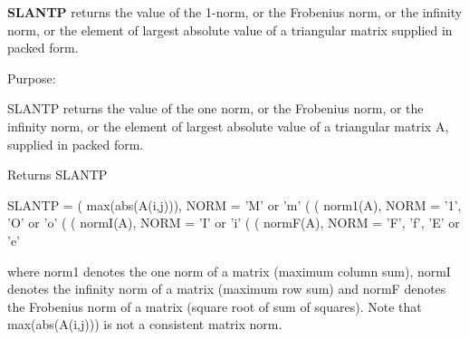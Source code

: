 {\bfseries S\+L\+A\+N\+T\+P} returns the value of the 1-\/norm, or the Frobenius norm, or the infinity norm, or the element of largest absolute value of a triangular matrix supplied in packed form. 

 \begin{DoxyParagraph}{Purpose\+: }
\begin{DoxyVerb} SLANTP  returns the value of the one norm,  or the Frobenius norm, or
 the  infinity norm,  or the  element of  largest absolute value  of a
 triangular matrix A, supplied in packed form.\end{DoxyVerb}

\end{DoxyParagraph}
\begin{DoxyReturn}{Returns}
S\+L\+A\+N\+T\+P \begin{DoxyVerb}    SLANTP = ( max(abs(A(i,j))), NORM = 'M' or 'm'
             (
             ( norm1(A),         NORM = '1', 'O' or 'o'
             (
             ( normI(A),         NORM = 'I' or 'i'
             (
             ( normF(A),         NORM = 'F', 'f', 'E' or 'e'

 where  norm1  denotes the  one norm of a matrix (maximum column sum),
 normI  denotes the  infinity norm  of a matrix  (maximum row sum) and
 normF  denotes the  Frobenius norm of a matrix (square root of sum of
 squares).  Note that  max(abs(A(i,j)))  is not a consistent matrix norm.\end{DoxyVerb}
 
\end{DoxyReturn}

